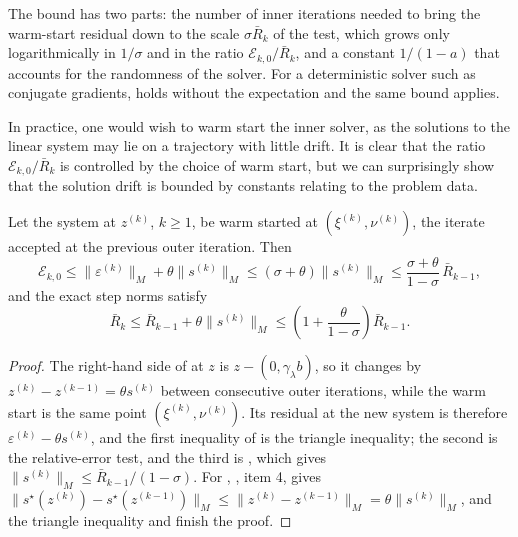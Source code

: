\documentclass[11pt]{article}
\begin{document}
The bound  has two parts: the number of inner iterations needed to bring the warm-start residual down to the scale $\sigma \bar R_k$ of the test, which grows only logarithmically in $1/\sigma$ and in the ratio $\mathcal{E}_{k,0}/\bar R_k$, and a constant $1/(1-a)$ that accounts for the randomness of the solver.
For a deterministic solver such as conjugate gradients,  holds without the expectation and the same bound applies.

In practice, one would wish to warm start the inner solver, as the solutions to the linear system may lie on a trajectory with little drift.
It is clear that the ratio $\mathcal{E}_{k,0}/\bar R_k$ is controlled by the choice of warm start, but we can surprisingly show that the solution drift is bounded by constants relating to the problem data.
\begin{lemma}\label{lem:warm-start-drift}
    Let the system at $z^{(k)}$, $k \geq 1$, be warm started at $(\xi^{(k)}, \nu^{(k)})$, the iterate accepted at the previous outer iteration.
    Then
    \begin{equation}\label{eq:warm-start-residual}
        \mathcal{E}_{k,0} \leq \|\varepsilon^{(k)}\|_M + \theta\|s^{(k)}\|_M \leq (\sigma + \theta)\|s^{(k)}\|_M \leq \frac{\sigma + \theta}{1 - \sigma}\,\bar R_{k-1},
    \end{equation}
    and the exact step norms satisfy
    \begin{equation}\label{eq:exact-step-growth}
        \bar R_{k} \leq \bar R_{k-1} + \theta\|s^{(k)}\|_M \leq \left(1 + \frac{\theta}{1-\sigma}\right)\bar R_{k-1}.
    \end{equation}
\end{lemma}
\begin{proof}
    The right-hand side of  at $z$ is $z - (0, \gamma_\lambda b)$, so it changes by $z^{(k)} - z^{(k-1)} = \theta s^{(k)}$ between consecutive outer iterations, while the warm start is the same point $(\xi^{(k)}, \nu^{(k)})$.
    Its residual at the new system is therefore $\varepsilon^{(k)} - \theta s^{(k)}$, and the first inequality of  is the triangle inequality; the second is the relative-error test, and the third is , which gives $\|s^{(k)}\|_M \leq \bar R_{k-1}/(1 - \sigma)$.
    For , , item 4, gives $\|s^\star(z^{(k)}) - s^\star(z^{(k-1)})\|_M \leq \|z^{(k)} - z^{(k-1)}\|_M = \theta\|s^{(k)}\|_M$, and the triangle inequality and  finish the proof.
\end{proof}
\end{document}
